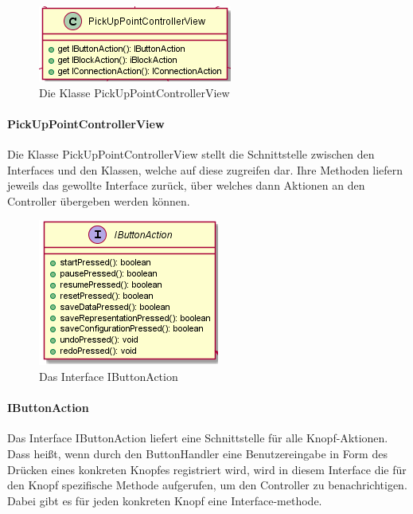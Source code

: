\documentclass[parskip=full]{scrartcl}
\begin{document}
\begin{figure}[htbp]
	\begin{center}
		\includegraphics[width = 8 cm]{Grafiken/View/PickUpPoint.png}
		\caption{Die Klasse PickUpPointControllerView}
		\label{PickUpPointControllerView}
	\end{center}
\end{figure}

\paragraph{PickUpPointControllerView}

Die Klasse PickUpPointControllerView stellt die Schnittstelle zwischen den Interfaces und den Klassen, welche auf diese zugreifen dar. Ihre Methoden liefern jeweils das gewollte Interface zurück, über welches dann Aktionen an den Controller übergeben werden können.

\clearpage

\begin{figure}[htbp]
	\begin{center}
		\includegraphics[width = 7 cm]{Grafiken/View/IButtonAction.png}
		\caption{Das Interface IButtonAction}
		\label{Entwurf_Grob}
	\end{center}
\end{figure}

\paragraph{IButtonAction}

Das Interface IButtonAction liefert eine Schnittstelle für alle Knopf-Aktionen. Dass heißt, wenn durch den ButtonHandler eine Benutzereingabe in Form des Drücken eines konkreten Knopfes registriert wird, wird in diesem Interface die für den Knopf spezifische Methode aufgerufen, um den Controller zu benachrichtigen. Dabei gibt es für jeden konkreten Knopf eine Interface-methode.
\end{document}
